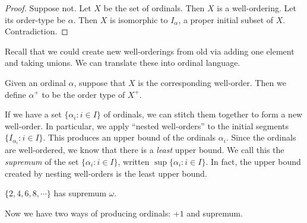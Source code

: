 \documentclass[a4paper]{article}
\begin{document}
\begin{proof}
  Suppose not. Let $X$ be the set of ordinals. Then $X$ is a well-ordering. Let its order-type be $\alpha$. Then $X$ is isomorphic to $I_\alpha$, a proper initial subset of $X$. Contradiction.
\end{proof}

Recall that we could create new well-orderings from old via adding one element and taking unions. We can translate these into ordinal language.

Given an ordinal $\alpha$, suppose that $X$ is the corresponding well-order. Then we define $\alpha^+$ to be the order type of $X^+$.

If we have a set $\{\alpha_i: i \in I\}$ of ordinals, we can stitch them together to form a new well-order. In particular, we apply ``nested well-orders'' to the initial segments $\{I_{\alpha_i}: i \in I\}$. This produces an upper bound of the ordinals $\alpha_i$. Since the ordinals are well-ordered, we know that there is a \emph{least} upper bound. We call this the \emph{supremum} of the set $\{\alpha_i: i \in I\}$, written $\sup\{\alpha_i: i \in I\}$. In fact, the upper bound created by nesting well-orders is the least upper bound.

\begin{eg}
  $\{2, 4, 6, 8, \cdots\}$ has supremum $\omega$.
\end{eg}

Now we have two ways of producing ordinals: $+1$ and supremum.
\end{document}
